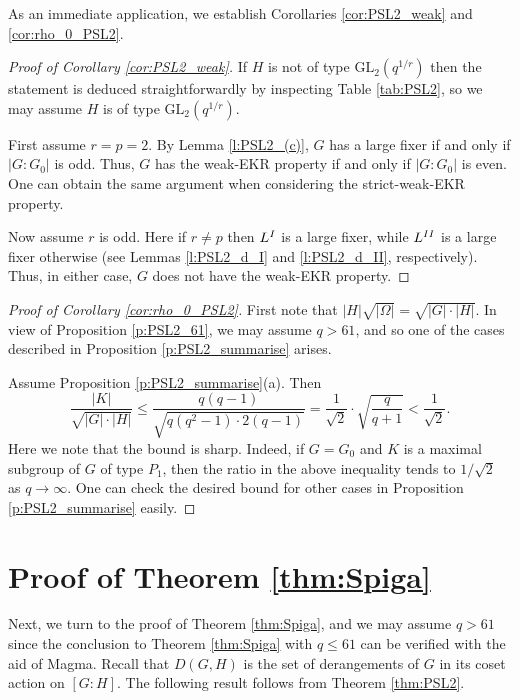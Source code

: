 \documentclass[twoside,a4paper,reqno,11pt]{amsart}
\newcommand{\<}{\langle}
\renewcommand{\>}{\rangle}
\renewcommand{\to}{\rightarrow}
\newcommand{\leqs}{\leqslant}
\newcommand{\GL}{\mathrm{GL}}
\theoremstyle{definition}
\begin{document}
	As an immediate application, we establish Corollaries \ref{cor:PSL2_weak} and \ref{cor:rho_0_PSL2}.
	
	\begin{proof}[Proof of Corollary \ref{cor:PSL2_weak}]
		If $H$ is not of type $\GL_2(q^{1/r})$ then the statement is deduced straightforwardly by inspecting Table \ref{tab:PSL2}, so we may assume $H$ is of type $\GL_2(q^{1/r})$.
		
		First assume $r = p = 2$. By Lemma \ref{l:PSL2_(c)}, $G$ has a large fixer if and only if $|G:G_0|$ is odd. Thus, $G$ has the weak-EKR property if and only if $|G:G_0|$ is even. One can obtain the same argument when considering the strict-weak-EKR property.
		
		Now assume $r$ is odd. Here if $r\ne p$ then $L^{\rm I}$ is a large fixer, while $L^{\rm II}$ is a large fixer otherwise (see Lemmas \ref{l:PSL2_d_I} and \ref{l:PSL2_d_II}, respectively). Thus, in either case, $G$ does not have the weak-EKR property.
	\end{proof}
	
	\begin{proof}[Proof of Corollary \ref{cor:rho_0_PSL2}]
		First note that $|H|\sqrt{|\Omega|} = \sqrt{|G|\cdot |H|}$. In view of Proposition \ref{p:PSL2_61}, we may assume $q > 61$, and so one of the cases described in Proposition \ref{p:PSL2_summarise} arises.
		
		Assume Proposition \ref{p:PSL2_summarise}(a). Then
		\begin{equation*}
		\frac{|K|}{\sqrt{|G|\cdot |H|}}\leqs \frac{q(q-1)}{\sqrt{q(q^2-1)\cdot 2(q-1)}} = \frac{1}{\sqrt{2}}\cdot \sqrt{\frac{q}{q+1}} < \frac{1}{\sqrt{2}}.
		\end{equation*}
		Here we note that the bound is sharp. Indeed, if $G = G_0$ and $K$ is a maximal subgroup of $G$ of type $P_1$, then the ratio in the above inequality tends to $1/\sqrt{2}$ as $q\to \infty$. One can check the desired bound for other cases in Proposition \ref{p:PSL2_summarise} easily.
	\end{proof}
	
	
	
	\section{Proof of Theorem \ref{thm:Spiga}}
	
	\label{s:Spiga}
	
	Next, we turn to the proof of Theorem \ref{thm:Spiga}, and we may assume $q > 61$ since the conclusion to Theorem \ref{thm:Spiga} with $q\leqs 61$ can be verified with the aid of {\sc Magma}. Recall that $D(G,H)$ is the set of derangements of $G$ in its coset action on $[G:H]$. The following result follows from Theorem \ref{thm:PSL2}.
	
\end{document}
